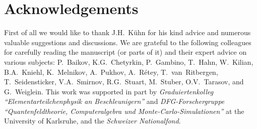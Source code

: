 %
\section*{Acknowledgements} 
First of all we would like to thank J.H.~K\"uhn for his kind advice and
numerous valuable suggestions and discussions.  We are grateful to the
following colleagues for carefully reading the manuscript (or parts of
it) and their expert advice on various subjects: P.~Baikov,
K.G.~Chetyrkin, P.~Gambino, T.~Hahn, W.~Kilian, B.A.~Kniehl,
K.~Melnikov, A.~Pukhov, A.~R\'etey, T.~van~Ritbergen, T.~Seidensticker,
V.A.~Smirnov, R.G.~Stuart, M.~Stuber, O.V.~Tarasov, and G.~Weiglein.
This work was supported in part by {\it Graduiertenkolleg
  ``Elementarteilchenphysik an Beschleunigern''} and {\it
  DFG-Forschergruppe ``Quantenfeldtheorie, Computeralgebra und
  Monte-Carlo-Simulationen''} at the University of Karlsruhe, and the
{\it Schweizer Nationalfond}.

